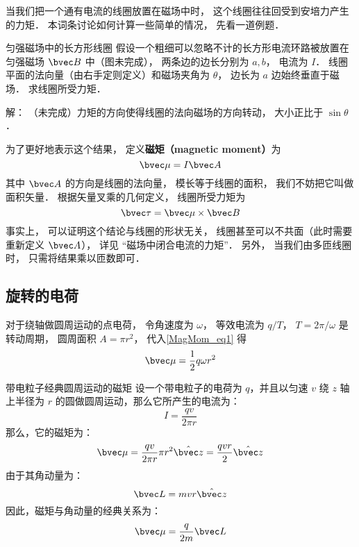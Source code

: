 
\begin{issues}
\issueTODO
\end{issues}


当我们把一个通有电流的线圈放置在磁场中时， 这个线圈往往回受到安培力产生的力矩． 本词条讨论如何计算一些简单的情况， 先看一道例题．

\begin{example}{匀强磁场中的长方形线圈}
假设一个粗细可以忽略不计的长方形电流环路被放置在匀强磁场 $\bvec B$ 中（图未完成）， 两条边的边长分别为 $a, b$， 电流为 $I$． 线圈平面的法向量（由右手定则定义）和磁场夹角为 $\theta$， 边长为 $a$ 边始终垂直于磁场． 求线圈所受力矩．

解： （未完成）力矩的方向使得线圈的法向磁场的方向转动， 大小正比于 $\sin\theta$．
\end{example}

为了更好地表示这个结果， 定义\textbf{磁矩（magnetic moment）}为
\begin{equation}\label{MagMom_eq1}
\bvec \mu = I \bvec A
\end{equation}
其中 $\bvec A$ 的方向是线圈的法向量， 模长等于线圈的面积， 我们不妨把它叫做面积矢量． 根据矢量叉乘的几何定义， 线圈所受力矩为
\begin{equation}
\bvec \tau = \bvec \mu \times \bvec B
\end{equation}
事实上， 可以证明这个结论与线圈的形状无关， 线圈甚至可以不共面（此时需要重新定义 $\bvec A$）， 详见 “磁场中闭合电流的力矩”． 另外， 当我们由多匝线圈时， 只需将结果乘以匝数即可．

\subsection{旋转的电荷}
对于绕轴做圆周运动的点电荷， 令角速度为 $\omega$， 等效电流为 $q/T$， $T = 2\pi/\omega$ 是转动周期， 圆周面积 $A = \pi r^2$， 代入\autoref{MagMom_eq1} 得
\begin{equation}
\bvec \mu = \frac{1}{2} q\omega r^2
\end{equation}

\begin{example}{带电粒子经典圆周运动的磁矩}\label{MagMom_ex1}
设一个带电粒子的电荷为 $q$，并且以匀速 $v$ 绕 $z$ 轴上半径为 $r$ 的圆做圆周运动，那么它所产生的电流为：
\begin{equation}
I=\frac{qv}{2\pi r}
\end{equation}
那么，它的磁矩为：
\begin{equation}
\bvec\mu  = \frac{qv}{2\pi r}\pi r^2 \hat{\bvec z}=\frac{qvr}{2} \hat{\bvec z} 
\end{equation}
由于其角动量为：
\begin{equation}
\bvec L =mvr\hat{\bvec z}
\end{equation}
因此，磁矩与角动量的经典关系为：
\begin{equation}
\bvec\mu  = \frac{q}{2m}\bvec L
\end{equation}

\end{example}
